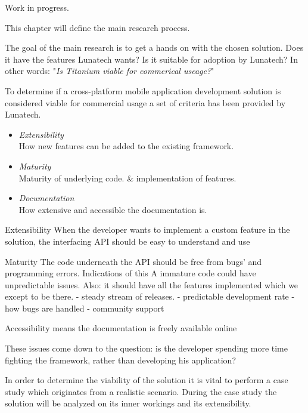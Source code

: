 Work in progress.

This chapter will define the main research process. 

The goal of the main research is to get a hands on with the chosen solution. Does it have the features Lunatech wants? Is it suitable for adoption by Lunatech? In other words: "\emph{Is Titanium viable for commerical useage?}"

To determine if a cross-platform mobile application development solution is considered viable for commercial usage a set of criteria has been provided by Lunatech.
\begin{itemize}
	\item \emph{Extensibility}\\
	How new features can be added to the existing framework.
	\item \emph{Maturity}\\ 
	Maturity of underlying code. \& implementation of features.
	\item \emph{Documentation}\\
	How extensive and accessible the documentation is.
\end{itemize}

Extensibility
When the developer wants to implement a custom feature in the solution, the interfacing API should be easy to understand and use

Maturity
The code underneath the API should be free from bugs' and programming errors.
Indications of this 
A immature code could have unpredictable issues.
Also: it should have all the features implemented which we except to be there. 
- steady stream of releases.
- predictable development rate
- how bugs are handled
- community support


Accessibility means the documentation is freely available online %

These issues come down to the question:
is the developer spending more time fighting the framework, rather than developing his application?

In order to determine the viability of the solution it is vital to perform a case study which originates from a realistic scenario. During the case study the solution will be analyzed on its inner workings and its extensibility.

